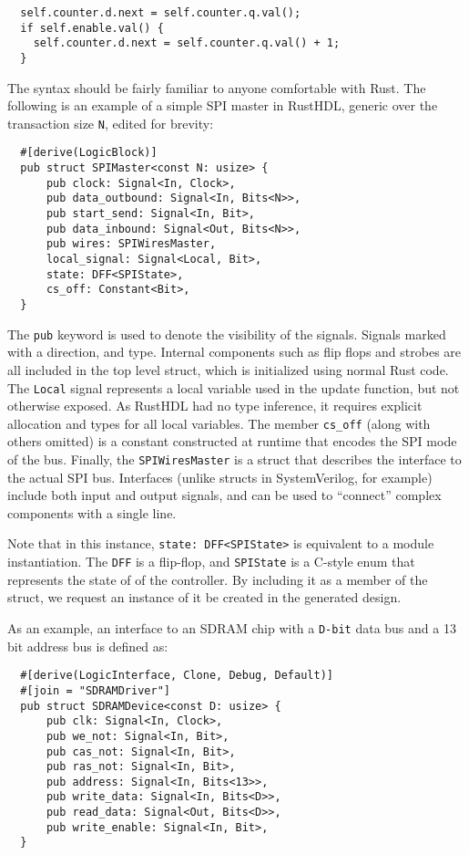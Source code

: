 \documentclass[sigplan,screen,sigconf]{acmart}
\begin{document}
\begin{verbatim}
  self.counter.d.next = self.counter.q.val();
  if self.enable.val() {
    self.counter.d.next = self.counter.q.val() + 1;
  }
\end{verbatim}

The syntax should be fairly familiar to anyone comfortable with Rust.  The following is an example
of a simple SPI master in RustHDL, generic over the transaction size \verb|N|, edited for brevity:

\begin{verbatim}
  #[derive(LogicBlock)]
  pub struct SPIMaster<const N: usize> {
      pub clock: Signal<In, Clock>,
      pub data_outbound: Signal<In, Bits<N>>,
      pub start_send: Signal<In, Bit>,
      pub data_inbound: Signal<Out, Bits<N>>,
      pub wires: SPIWiresMaster,
      local_signal: Signal<Local, Bit>,
      state: DFF<SPIState>,
      cs_off: Constant<Bit>,
  }
\end{verbatim}  

The \verb|pub| keyword is used to denote the visibility of the signals.  Signals 
marked with a direction, and type.  Internal components such as flip flops and strobes
are all included in the top level struct, which is initialized using normal Rust code.
The \verb|Local| signal represents a local variable used in the update function, but
not otherwise exposed.  As RustHDL had no type inference, it requires explicit allocation
and types for all local variables.  The member \verb|cs_off| (along with others omitted) is a  
constant constructed at runtime that encodes the SPI mode of the bus.  Finally, 
the \verb|SPIWiresMaster| is a struct that describes the interface to the actual SPI bus.
Interfaces (unlike structs in SystemVerilog, for example) include both input and output
signals, and can be used to ``connect'' complex components with a single line.  

Note that in this instance, \verb|state: DFF<SPIState>| is equivalent to a module instantiation.
The \verb|DFF| is a flip-flop, and \verb|SPIState| is a C-style enum that represents the state of
of the controller.  By including it as a member of the struct, we request an instance of it be
created in the generated design.


As an example, an interface to an SDRAM chip with a \verb|D-bit| data bus and a 13 bit 
address bus is defined as:

\begin{verbatim}
  #[derive(LogicInterface, Clone, Debug, Default)]
  #[join = "SDRAMDriver"]
  pub struct SDRAMDevice<const D: usize> {
      pub clk: Signal<In, Clock>,
      pub we_not: Signal<In, Bit>,
      pub cas_not: Signal<In, Bit>,
      pub ras_not: Signal<In, Bit>,
      pub address: Signal<In, Bits<13>>,
      pub write_data: Signal<In, Bits<D>>,
      pub read_data: Signal<Out, Bits<D>>,
      pub write_enable: Signal<In, Bit>,
  }
\end{verbatim}
\end{document}
